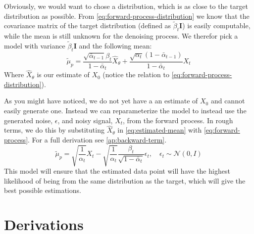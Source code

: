 \documentclass[a4paper, 12pt]{olplainarticle}
\begin{document}
Obviously, we would want to chose a distribution, which is as close to the target distribution as possible.
From \cref{eq:forward-process-distribution} we know that the covariance matrix of the target distribution (defined as $\tilde{\beta}_t \mathbf{I}$) is easily computable, while the mean is still unknown for the denoising process. 
We therefor pick a model with variance $\tilde{\beta}_t \mathbf{I}$ and the following mean:
\begin{equation} \label{eq:estimated-mean}
    \tilde{\mu}_p = \frac{\sqrt{\bar{\alpha}_{t-1}}\beta_t}{1-\bar{\alpha}_t}\hat{X}_{\theta} + \frac{\sqrt{\alpha_t}(1-\bar{\alpha}_{t-1})}{1-\bar{\alpha}_t}X_t
\end{equation}
Where $\hat{X}_{\theta}$ is our estimate of $X_0$ (notice the relation to \cref{eq:forward-process-distribution}).

As you might have noticed, we do not yet have a an estimate of $X_0$ and cannot easily generate one.
Instead we can reparameterize the model to instead use the generated noise, $\epsilon$, and noisy signal, $X_t$, from the forward process.
In rough terms, we do this by substituting $\hat{X}_{\theta}$ in \cref{eq:estimated-mean} with \cref{eq:forward-process}. For a full derivation see \cref{ap:backward-term}.
\begin{equation} \label{eq:denoising}
    \tilde{\mu}_p = \sqrt{\frac{1}{\alpha_t}}X_t - \sqrt{\frac{1}{\alpha_t}}\frac{\beta_t}{\sqrt{1-\bar{\alpha}_t}}\epsilon_t, \quad \epsilon_t \sim \mathcal{N}(0,I)
\end{equation}
This model will ensure that the estimated data point will have the highest likelihood of being from the same distribution as the target, which will give the best possible estimations.
\newpage


\newpage
\appendix
\section{Derivations}
\end{document}
